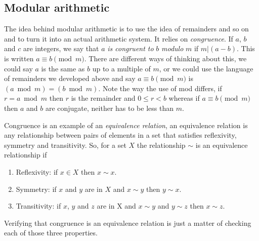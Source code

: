 \documentclass[12pt]{article}
\begin{document}
\subsection*{Modular arithmetic}

The idea behind modular arithmetic is to use the idea of remainders
and so on and to turn it into an actual arithmetic system. It relies
on \emph{congruence}. If $a$, $b$ and $c$ are integers, we say that
$a$ \emph{is congruent to } $b$ \emph{modulo} $m$ if $m|(a-b)$. This
is written $a\equiv b\pmod m$. There are different ways of thinking
about this, we could say $a$ is the same as $b$ up to a multiple of
$m$, or we could use the language of remainders we developed above and
say $a\equiv b \pmod m$ is $(a \bmod m)=(b \bmod m)$. Note the way the
use of mod differs, if $r=a\bmod m$ then $r$ is the remainder and
$0\le r<b$ whereas if $a\equiv b\pmod m$ then $a$ and $b$ are
conjugate, neither has to be less than $m$.

Congruence is an example of an \emph{equivalence relation}, an equivalence relation is any relationship between pairs of elements in a set that satisfies reflexivity, symmetry and transitivity. So, for a set $X$ the relationship $\sim$ is an equivalence relationship if 
\begin{enumerate}
\item Reflexivity: if $x\in X$ then $x\sim x$.
\item Symmetry: if $x$ and $y$ are in $X$ and $x\sim y$ then $y\sim x$.
\item Transitivity: if $x$, $y$ and $z$ are in X and $x\sim y$ and
  $y\sim z$ then $x\sim z$.
\end{enumerate}
Verifying that congruence is an equivalence relation is just a matter of checking each of those three properties.\HandLeft
\end{document}
